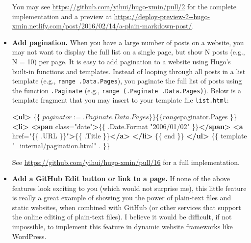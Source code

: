 \documentclass[12pt,]{krantz}
\makeatletter
\newenvironment{Shaded}{\begin{snugshade}}{\end{snugshade}}
\newcommand{\KeywordTok}[1]{\textcolor[rgb]{0.13,0.29,0.53}{\textbf{#1}}}
\newcommand{\StringTok}[1]{\textcolor[rgb]{0.31,0.60,0.02}{#1}}
\newcommand{\OtherTok}[1]{\textcolor[rgb]{0.56,0.35,0.01}{#1}}
\newcommand{\NormalTok}[1]{#1}
\newenvironment{kframe}{%
\medskip{}
\setlength{\fboxsep}{.8em}
 \def\at@end@of@kframe{}%
 \ifinner\ifhmode%
  \def\at@end@of@kframe{\end{minipage}}%
  \begin{minipage}{\columnwidth}%
 \fi\fi%
 \def\FrameCommand##1{\hskip\@totalleftmargin \hskip-\fboxsep
 \colorbox{shadecolor}{##1}\hskip-\fboxsep
     \hskip-\linewidth \hskip-\@totalleftmargin \hskip\columnwidth}%
 \MakeFramed {\advance\hsize-\width
   \@totalleftmargin\z@ \linewidth\hsize
   \@setminipage}}%
 {\par\unskip\endMakeFramed%
 \at@end@of@kframe}
\renewenvironment{Shaded}{\begin{kframe}}{\end{kframe}}
\theoremstyle{definition}
\theoremstyle{definition}
\theoremstyle{definition}
\theoremstyle{remark}
\makeatother
\begin{document}
\begin{itemize}
  You may see \url{https://github.com/yihui/hugo-xmin/pull/2} for the
  complete implementation and a preview at
  \url{https://deploy-preview-2--hugo-xmin.netlify.com/post/2016/02/14/a-plain-markdown-post/}.
\item
  \textbf{Add pagination.} When you have a large number of posts on a
  website, you may not want to display the full list on a single page,
  but show N posts (e.g., N = 10) per page. It is easy to add pagination
  to a website using Hugo's built-in functions and templates. Instead of
  looping through all posts in a list template (e.g.,
  \texttt{range\ .Data.Pages}), you paginate the full list of posts
  using the function \texttt{.Paginate} (e.g.,
  \texttt{range\ (.Paginate\ .Data.Pages)}). Below is a template
  fragment that you may insert to your template file \texttt{list.html}:

\begin{Shaded}
\begin{Highlighting}[]
\KeywordTok{<ul>}
\NormalTok{  \{\{ $paginator := .Paginate .Data.Pages \}\}}
\NormalTok{  \{\{ range $paginator.Pages \}\}}
  \KeywordTok{<li>}
    \KeywordTok{<span}\OtherTok{ class=}\StringTok{"date"}\KeywordTok{>}\NormalTok{\{\{ .Date.Format "2006/01/02" \}\}}\KeywordTok{</span>}
    \KeywordTok{<a}\OtherTok{ href=}\StringTok{"\{\{ .URL \}\}"}\KeywordTok{>}\NormalTok{\{\{ .Title \}\}}\KeywordTok{</a>}
  \KeywordTok{</li>}
\NormalTok{  \{\{ end \}\}}
\KeywordTok{</ul>}
\NormalTok{\{\{ template "_internal/pagination.html" . \}\}}
\end{Highlighting}
\end{Shaded}

  See \url{https://github.com/yihui/hugo-xmin/pull/16} for a full
  implementation.
\item
  \textbf{Add a GitHub Edit button or link to a page.} If
  none of the above features look exciting to
  you (which would not surprise me), this little feature is really a
  great example of showing you the power of plain-text files and static
  websites, when combined with GitHub (or other services that support
  the online editing of plain-text files). I believe it would be
  difficult, if not impossible, to implement this feature in dynamic
  website frameworks like WordPress.


\end{itemize}
\end{document}
